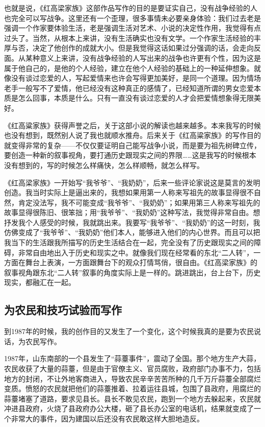 \documentclass[12pt,a5paper]{ctexbook}
\begin{document}
也就是说，《红高梁家族》这部作品写作的目的是要证实自己，没有战争经验的人也完全可以写战争。这里还有一个歪理，很多事情未必要亲身体验：我们过去老是强调一个作家要体验生活，老是强调生活对艺术、小说的决定性作用，我觉得有点过头了。当然，从根本上来讲，没有生活确实也没有文学。一个作家生活经验的丰厚与否，决定了他创作的成就大小。但是我觉得这话如果过分强调的话，会走向反面。从某种意义上来讲，没有战争经验的人写出来的战争也许更有个性，因为这是属于他自己的，是他的个人经验，建立在他个人经验的基础上的一种延伸想象。就像没有谈过恋爱的人，写起爱情来也许会写得更加美好，是同一个道理。因为情场老手一般写不了爱情，他已经没有这种真正的感情了，已经知道所谓的男女恋爱本质是怎么回事，本质是什么。只有一直没有谈过恋爱的人才会把爱情想象得无限美好。

《红高粱家族》获得声誉之后，关于这部小说的解读也越来越多。本来我写的时候也没有想到，既然别人说了我也就顺水推舟。后来关于《红高粱家族》的写作目的就变得非常的复杂——不仅仅要证明自己能写战争小说，而是要为祖先树碑立传，要创造一种新的叙事视角，要打通历史跟现实之间的界限……这是我写的时候根本没有想到的，写的时候怎么样痛快，怎么样顺畅，就怎么样写。

《红高梁家族》一开始写“我爷爷”、“我奶奶”，后来一些评论家说这是莫言的发明创造。我当时实际上是逼出来的，我想如果用第一人称来写祖先的故事显得很不自然，肯定没法写，我不可能变成“我爷爷”、“我奶奶”；如果用第三人称来写祖先的故事显得很陈旧、很笨拙；用“我爷爷”、“我奶奶”这种写法，我觉得非常自由。想抒发我个人感受的时候，我就跳出来。我要写“我爷爷”、“我奶奶”的这一时刻，我仿佛变成了“我爷爷”、“我奶奶”他们本人，能够进入他们的内心世界。而且可以把我当下的生活跟我所描写的历史生活结合在一起，完全没有了历史跟现实之间的障碍，非常自由地出入于历史和现实之中。就像我们现在经常看的东北“二人转”，一方面在舞台上表演，一方面跟舞台下的观众打情骂俏，很自由。《红高梁家族》的叙事视角跟东北“二人转”叙事的角度实际上是一样的。跳进跳出，台上台下，历史现实，都融汇在一起。

\subsection{为农民和技巧试验而写作}

到1987年的时候，我的创作目的又发生了一个变化，这个时候我真的是要为农民说话，为农民写作。

1987年，山东南部的一个县发生了“蒜薹事件”，震动了全国。那个地方生产大蒜，农民收获了大量的蒜薹，但是由于官僚主义、官员腐败，政府部门办事不力，包括地方的封闭，不让外地客商进入，导致农民辛辛苦苦所种的几千万斤蒜薹全部腐烂变质。愤怒的农民就把他们的蒜薹推着、拉着运往县城，包围了县政府，用腐烂的蒜薹堵塞了道路，要求见县长。县长不敢见农民，跑到一个地方去躲起来，农民就冲进县政府，火烧了县政府办公大楼，砸了县长办公室的电话机，结果就变成了一个非常大的事件，因为建国以后还没有农民敢这样大胆地造反。
\end{document}
